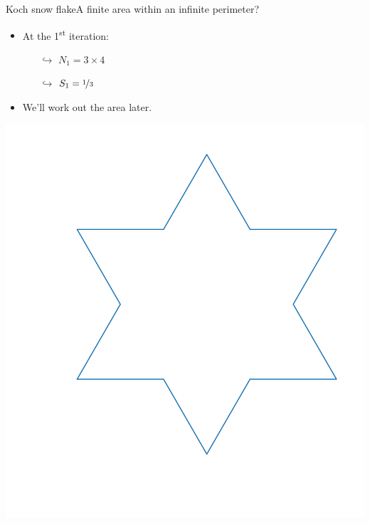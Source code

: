 \documentclass[usenames,dvipsnames,svgnames,10pt,aspectratio=169]{beamer}
\begin{document}
\begin{frame}[t, c]{Koch snow flake}{A finite area within an infinite perimeter?}
	\centering
	\begin{minipage}{.48\textwidth}
		\begin{itemize}
			\item At the 1\textsuperscript{st} iteration:
			\begin{itemize}
				\item[$\hookrightarrow$] $N_1 = 3 \times 4$
				\item[$\hookrightarrow$] $S_1 = \nicefrac{1}{3}$
			\end{itemize}

			\bigskip

			\item We'll work out the area later.
		\end{itemize}
	\end{minipage}%
	\hfill
	\begin{minipage}{.48\textwidth}
		\centering
		\includegraphics[width=.8\textwidth]{koch_1_it}
	\end{minipage}

	\vspace{1cm}
\end{frame}
\end{document}
